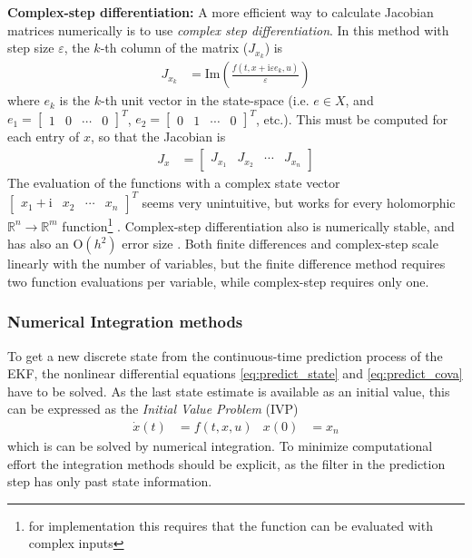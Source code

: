 \textbf{Complex-step differentiation:}
A more efficient way to calculate Jacobian matrices numerically is to use \textit{complex step differentiation}.
In this method with step size $\varepsilon$, the $k$-th column of the matrix ($J_{x_k}$) is \cite{martins2003}
\begin{align}
    J_{x_k} &= \mathrm{Im} \left( \frac{f(t, x + \mathrm{i} \varepsilon e_k, u)}{\varepsilon} \right)
    \label{eq:appendix_jacobian_complex_step}
\end{align}
where $e_k$ is the $k$-th unit vector in the state-space (i.e. $e \in X$, and $e_1 = [\begin{smallmatrix} 1 & 0 & \cdots & 0 \end{smallmatrix}]^T$, $e_2 = [\begin{smallmatrix} 0 & 1 & \cdots & 0 \end{smallmatrix}]^T$, etc.).
This must be computed for each entry of $x$, so that the Jacobian is 
\begin{align}
    J_x &= \begin{bmatrix}
        J_{x_1} & J_{x_2} & \cdots & J_{x_n} 
    \end{bmatrix} 
\end{align}
The evaluation of the functions with a complex state vector $[\begin{smallmatrix} x_1 + \mathrm{i} & x_2 & \cdots & x_n \end{smallmatrix}]^T$ seems very unintuitive, but works for every holomorphic $\mathbb{R}^n \rightarrow \mathbb{R}^m$ function\footnote{for implementation this requires that the function can be evaluated with complex inputs} \cite{martins2021}.
Complex-step differentiation also is numerically stable, and has also an $\mathrm{O}(h^2)$ error size \cite{martins2003}. 
Both finite differences and complex-step scale linearly with the number of variables, but the finite difference method requires two function evaluations per variable, while complex-step requires only one.


\subsubsection{Numerical Integration methods}
\label{sec:numerical-integration}
To get a new discrete state from the continuous-time prediction process of the EKF, the nonlinear differential equations \ref{eq:predict_state} and \ref{eq:predict_cova} have to be solved.
As the last state estimate is available as an initial value, this can be expressed as the \textit{Initial Value Problem} (IVP)
\begin{align}
    \dot x(t) &= f(t, x, u) & x(0) &= x_{n} 
\end{align}
which is can be solved by numerical integration. 
To minimize computational effort the integration methods should be explicit, as the filter in the prediction step has only past state information. 


